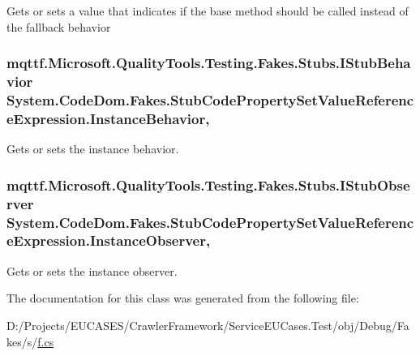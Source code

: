 Gets or sets a value that indicates if the base method should be called instead of the fallback behavior

\hypertarget{class_system_1_1_code_dom_1_1_fakes_1_1_stub_code_property_set_value_reference_expression_a94da1f4ac2c5170bbd723ab637617326}{
\subsubsection[{Instance\-Behavior}]{\setlength{\rightskip}{0pt plus 5cm}mqttf.\-Microsoft.\-Quality\-Tools.\-Testing.\-Fakes.\-Stubs.\-I\-Stub\-Behavior System.\-Code\-Dom.\-Fakes.\-Stub\-Code\-Property\-Set\-Value\-Reference\-Expression.\-Instance\-Behavior\hspace{0.3cm}{\ttfamily [get]}, {\ttfamily [set]}}}\label{class_system_1_1_code_dom_1_1_fakes_1_1_stub_code_property_set_value_reference_expression_a94da1f4ac2c5170bbd723ab637617326}


Gets or sets the instance behavior.

\hypertarget{class_system_1_1_code_dom_1_1_fakes_1_1_stub_code_property_set_value_reference_expression_af962e86438df8132ff19a5bb0e7709e5}{
\subsubsection[{Instance\-Observer}]{\setlength{\rightskip}{0pt plus 5cm}mqttf.\-Microsoft.\-Quality\-Tools.\-Testing.\-Fakes.\-Stubs.\-I\-Stub\-Observer System.\-Code\-Dom.\-Fakes.\-Stub\-Code\-Property\-Set\-Value\-Reference\-Expression.\-Instance\-Observer\hspace{0.3cm}{\ttfamily [get]}, {\ttfamily [set]}}}\label{class_system_1_1_code_dom_1_1_fakes_1_1_stub_code_property_set_value_reference_expression_af962e86438df8132ff19a5bb0e7709e5}


Gets or sets the instance observer.



The documentation for this class was generated from the following file\-:\begin{DoxyCompactItemize}
\item 
D\-:/\-Projects/\-E\-U\-C\-A\-S\-E\-S/\-Crawler\-Framework/\-Service\-E\-U\-Cases.\-Test/obj/\-Debug/\-Fakes/s/\hyperlink{s_2f_8cs}{f.\-cs}\end{DoxyCompactItemize}
